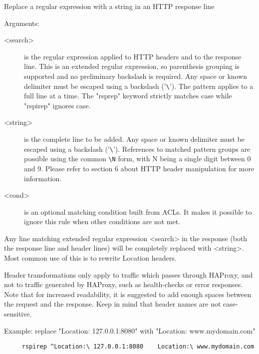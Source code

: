 
  Replace a regular expression with a string in an HTTP response line


  Arguments:
  \begin{description}
  \item[<search>] is the regular expression applied to HTTP headers and to the
              response line. This is an extended regular expression, so
              parenthesis grouping is supported and no preliminary backslash
              is required. Any space or known delimiter must be escaped using
              a backslash ('\verb|\|'). The pattern applies to a full line at a time.
              The "rsprep" keyword strictly matches case while "rspirep"
              ignores case.

  \item[<string>] is the complete line to be added. Any space or known delimiter
              must be escaped using a backslash ('\verb|\|'). References to matched
              pattern groups are possible using the common \verb|\N| form, with N
              being a single digit between 0 and 9. Please refer to section
              6 about HTTP header manipulation for more information.

  \item[<cond>] is an optional matching condition built from ACLs. It makes it
              possible to ignore this rule when other conditions are not met.
  \end{description}

  Any line matching extended regular expression <search> in the response (both
  the response line and header lines) will be completely replaced with
  <string>. Most common use of this is to rewrite Location headers.

  Header transformations only apply to traffic which passes through HAProxy,
  and not to traffic generated by HAProxy, such as health-checks or error
  responses. Note that for increased readability, it is suggested to add enough
  spaces between the request and the response. Keep in mind that header names
  are not case-sensitive.

  Example: replace "Location: 127.0.0.1:8080" with "Location: www.mydomain.com"
  \begin{verbatim}
     rspirep ^Location:\ 127.0.0.1:8080    Location:\ www.mydomain.com
  \end{verbatim}

